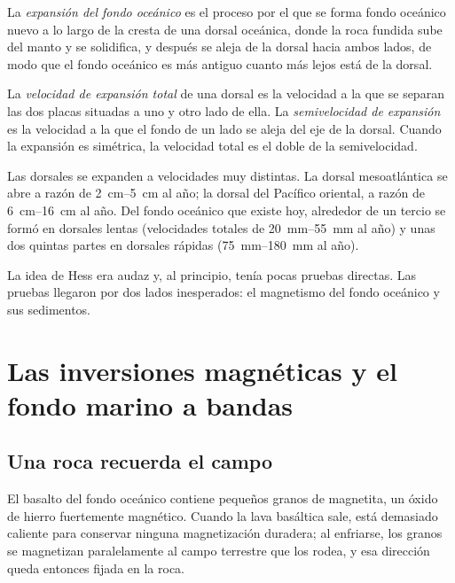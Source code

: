 \begin{definition}\label{def:g11:drift-to-spreading:spreading}
La \emph{expansión del fondo oceánico}
es el proceso por el que se forma fondo oceánico nuevo a lo largo de la
cresta de una dorsal oceánica, donde la roca fundida sube del manto y se
solidifica, y después se aleja de la dorsal hacia ambos lados, de modo que el
fondo oceánico es más antiguo cuanto más lejos está de la dorsal.
\end{definition}

\begin{definition}\label{def:g11:drift-to-spreading:spreading-rate}
La \emph{velocidad de expansión total}
de una dorsal es la velocidad a la que se separan las dos placas situadas a
uno y otro lado de ella. La \emph{semivelocidad de expansión} es la velocidad
a la que el fondo de un lado se aleja del eje de la dorsal. Cuando la
expansión es simétrica, la velocidad total es el doble de la semivelocidad.
\end{definition}

Las dorsales se expanden a velocidades muy distintas. La dorsal mesoatlántica
se abre a razón de \qtyrange{2}{5}{cm} al año; la dorsal del Pacífico
oriental, a razón de \qtyrange{6}{16}{cm} al año. Del fondo oceánico que
existe hoy, alrededor de un tercio se formó en dorsales lentas (velocidades
totales de \qtyrange{20}{55}{mm} al año) y unas dos quintas partes en dorsales
rápidas (\qtyrange{75}{180}{mm} al año).

La idea de Hess era audaz y, al principio, tenía pocas pruebas directas. Las
pruebas llegaron por dos lados inesperados: el magnetismo del fondo oceánico
y sus sedimentos.

\section{Las inversiones magnéticas y el fondo marino a bandas}

\subsection{Una roca recuerda el campo}

El basalto del fondo oceánico contiene pequeños granos de magnetita, un óxido
de hierro fuertemente magnético. Cuando la lava basáltica sale, está
demasiado caliente para conservar ninguna magnetización duradera; al
enfriarse, los granos se magnetizan paralelamente al campo terrestre que los
rodea, y esa dirección queda entonces fijada en la roca.

